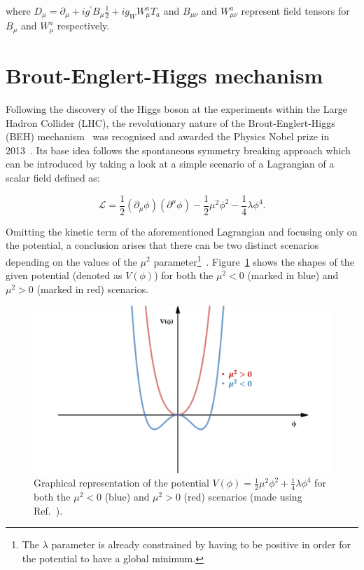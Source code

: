 where $D_\mu = \partial_\mu+ ig^{'}B_{\mu}\frac{1}{2} + ig_WW_{\mu}^aT_a$ and $B_{\mu\nu}$ and $W_{\mu\nu}^a$ represent field tensors for $B_{\mu}$ and $W_{\mu}^a$ respectively.

\section{Brout-Englert-Higgs mechanism}
\hspace{10pt} Following the discovery of the Higgs boson at the experiments within the Large Hadron Collider (LHC), the revolutionary nature of the Brout-Englert-Higgs (BEH) mechanism~\cite{brout, higgs} was recognised and awarded the Physics Nobel prize in 2013~\cite{nobel_beh}. Its base idea follows the spontaneous symmetry breaking approach which can be introduced by taking a look at a simple scenario of a Lagrangian of a scalar field defined as:

\begin{equation}
    \mathcal{L} = \frac{1}{2}(\partial_{\mu}\phi)(\partial^{\mu}\phi) - \frac{1}{2}\mu^2\phi^2 - \frac{1}{4}\lambda\phi^4.
\end{equation}

Omitting the kinetic term of the aforementioned Lagrangian and focusing only on the potential, a conclusion arises that there can be two distinct scenarios depending on the values of the $\mu^2$ parameter\footnote{The $\lambda$ parameter is already constrained by having to be positive in order for the potential to have a global minimum.}~\cite{thomson_2013,book:schwartz}. Figure~\ref{fig:higgs_potential} shows the shapes of the given potential (denoted as $V(\phi)$) for both the $\mu^2<0$ (marked in blue) and $\mu^2>0$ (marked in red) scenarios.

\begin{figure}[!htbp]
  \centering
    \includegraphics[width=\textwidth]{Theory/Higgs.png}
  \caption{Graphical representation of the potential $V(\phi) = \frac{1}{2}\mu^2\phi^2 + \frac{1}{4}\lambda\phi^4$ for both the $\mu^2<0$ (blue) and $\mu^2>0$ (red) scenarios (made using Ref.~\cite{desmos}). }
  \label{fig:higgs_potential}
\end{figure}

